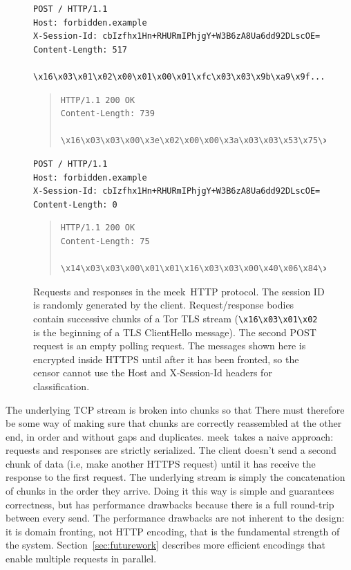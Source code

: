 \documentclass[conference]{IEEEtran}
\def\meek{meek}
\begin{document}
\begin{figure}
\scriptsize
\begin{verbatim}
POST / HTTP/1.1
Host: forbidden.example
X-Session-Id: cbIzfhx1Hn+RHURmIPhjgY+W3B6zA8Ua6dd92DLscOE=
Content-Length: 517

\x16\x03\x01\x02\x00\x01\x00\x01\xfc\x03\x03\x9b\xa9\x9f...
\end{verbatim}
\smallskip
\begin{quote}
\begin{verbatim}
HTTP/1.1 200 OK
Content-Length: 739

\x16\x03\x03\x00\x3e\x02\x00\x00\x3a\x03\x03\x53\x75\xa2...
\end{verbatim}
\end{quote}
\smallskip
\begin{verbatim}
POST / HTTP/1.1
Host: forbidden.example
X-Session-Id: cbIzfhx1Hn+RHURmIPhjgY+W3B6zA8Ua6dd92DLscOE=
Content-Length: 0

\end{verbatim}
\smallskip
\begin{quote}
\begin{verbatim}
HTTP/1.1 200 OK
Content-Length: 75

\x14\x03\x03\x00\x01\x01\x16\x03\x03\x00\x40\x06\x84\x25...
\end{verbatim}
\end{quote}
\caption{
Requests and responses in the \meek\ HTTP protocol.
The session ID is randomly generated by the client.
Request/response bodies contain successive chunks of a Tor TLS stream
(\texttt{\textbackslash{}x16\textbackslash{}x03\textbackslash{}x01\textbackslash{}x02}
is the beginning of a TLS ClientHello message).
The second POST request is an empty polling request.
The messages shown here is encrypted inside HTTPS until after
it has been fronted,
so the censor cannot use the
Host and X-Session-Id headers for classification.
}
\label{fig:protocol}
\end{figure}

The underlying TCP stream is broken into chunks so that
There must therefore be some way of making sure that chunks
are correctly reassembled at the other end,
in order and without gaps and duplicates.
\meek\ takes a naive approach: requests and responses are strictly serialized.
The client doesn't send a second chunk of data
(i.e, make another HTTPS request) until it has
receive the response to the first request.
The underlying stream is simply the concatenation
of chunks in the order they arrive.
Doing it this way is simple and guarantees correctness,
but has performance drawbacks because there is a full round-trip
between every send.
The performance drawbacks are not inherent to the design:
it is domain fronting, not HTTP encoding, that is the fundamental strength of the system.
Section~\ref{sec:futurework} describes more efficient encodings
that enable multiple requests in parallel.
\end{document}
